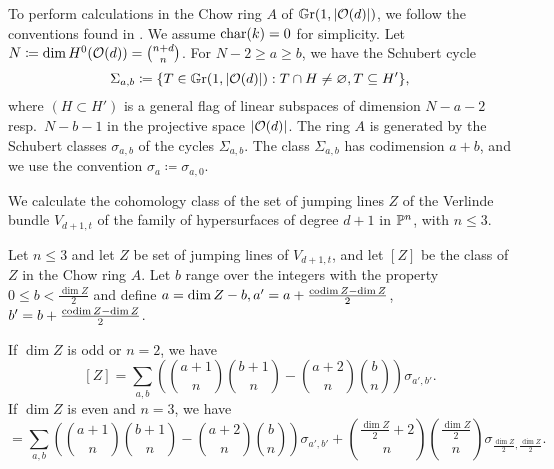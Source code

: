 To perform calculations in the Chow ring $A$ of $\mathbb G \mathrm r(1,\lvert\mathcal{O}(d)\rvert)$, we follow the conventions found in \cite{eisenbud-harris-intersection-theory}. We assume $\operatorname{char}(k) = 0$ for simplicity. Let $N\coloneqq \dim H^0(\mathcal{O}(d)) = \binom{n+d}{n}$. For $N-2\geq a\geq b$, we have the Schubert cycle 
\[
	\Sigma_{a,b}\coloneqq \{T \in \mathbb G \mathrm r(1,\lvert\mathcal{O}(d)\rvert) : T \cap H \neq \varnothing, T \subseteq H'\},
\]
where $(H\subset H')$ is a general flag of linear subspaces of dimension $N-a-2$ resp.\ $N-b-1$ in the projective space $\lvert\mathcal{O}(d)\rvert$.
The ring $A$ is generated by the Schubert classes $\sigma_{a,b}$ of the cycles $\Sigma_{a,b}$.
The class $\Sigma_{a,b}$ has codimension $a+b$, and we use the convention $\sigma_{a}\coloneqq \sigma_{a,0}$.

We calculate the cohomology class of the set of jumping lines $Z$ of the Verlinde bundle $V_{d+1,t}$ of the family of hypersurfaces of degree $d+1$ in $\mathbb{P}^n$, with $n\leq 3$.


\begin{theorem} \label{thm:cohomology-class}
	Let $n \leq 3$ and let $Z$ be set of jumping lines of $V_{d+1,t}$, and let $[Z]$ be the class of $Z$ in the Chow ring $A$. Let $b$ range over the integers with the property $0\leq b < \frac{\dim Z}{2}$ and define $a=\dim Z - b, a'=a+\frac{\operatorname{codim} Z-\dim Z}{2}$, $b'=b+\frac{\operatorname{codim} Z-\dim Z}{2}$.
	\begin{enumerate}
		\huyitem If $\dim Z$ is odd or $n=2$, we have
		\begin{equation} \label{class-of-locus}
			[Z] = \sum_{a,b} \left({\binom{a+1}{n}}{\binom{b+1}{n}}-{\binom{a+2}{n}}{\binom{b}{n}}\right) \sigma_{a',b'}. 
		\end{equation}
		\huyitem If $\dim Z$ is even and $n=3$, we have
		\begin{equation*}
			[Z] = \sum_{a,b} \left({\binom{a+1}{n}}{\binom{b+1}{n}}-{\binom{a+2}{n}}{\binom{b}{n}}\right) \sigma_{a',b'}
			+
			\binom{\frac{\dim Z}{2} + 2}{n}\binom{\frac{\dim Z}{2}}{n}\sigma_{\frac{\dim Z}{2},\frac{\dim Z}{2}}.
		\end{equation*}
	\end{enumerate}
\end{theorem}

